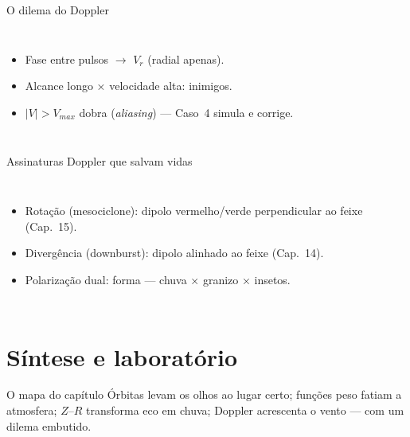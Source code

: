 \documentclass[aspectratio=169,11pt]{beamer}
\begin{document}
\begin{frame}{O dilema do Doppler}
  \begin{columns}
    \vspace{0.4em}
    \begin{itemize}
      \item Fase entre pulsos $\to$ $V_r$ (radial apenas).
      \item Alcance longo × velocidade alta: \alert{inimigos}.
      \item $|V| > V_{max}$ dobra (\emph{aliasing}) — Caso~4 simula e
            corrige.
    \end{itemize}
  \end{columns}
\end{frame}

\begin{frame}{Assinaturas Doppler que salvam vidas}
  \begin{columns}
    \begin{itemize}
      \item Rotação (mesociclone): dipolo vermelho/verde
            \alert{perpendicular} ao feixe (Cap.~15).
      \item Divergência (downburst): dipolo \alert{alinhado} ao feixe
            (Cap.~14).
      \item Polarização dual: forma — chuva × granizo × insetos.
    \end{itemize}
  \end{columns}
\end{frame}

\section{Síntese e laboratório}

\begin{frame}{O mapa do capítulo}
  \vspace{0.6em}
  Órbitas levam os olhos ao lugar certo; funções peso fatiam a
  atmosfera; $Z$--$R$ transforma eco em chuva; Doppler acrescenta o
  vento — com um dilema embutido.
\end{frame}
\end{document}
